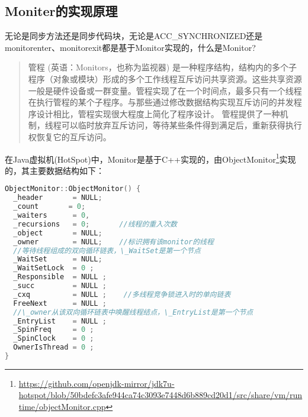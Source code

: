 \documentclass[../../../interview-questions.tex]{subfiles}
\begin{document}
\subsection{Moniter的实现原理}

无论是同步方法还是同步代码块，无论是ACC\_SYNCHRONIZED还是monitorenter、monitorexit都是基于Monitor实现的，什么是Monitor?

\begin{quotation}
管程 (英语：Monitors，也称为监视器) 是一种程序结构，结构内的多个子程序（对象或模块）形成的多个工作线程互斥访问共享资源。这些共享资源一般是硬件设备或一群变量。管程实现了在一个时间点，最多只有一个线程在执行管程的某个子程序。与那些通过修改数据结构实现互斥访问的并发程序设计相比，管程实现很大程度上简化了程序设计。 管程提供了一种机制，线程可以临时放弃互斥访问，等待某些条件得到满足后，重新获得执行权恢复它的互斥访问。
\end{quotation}

在Java虚拟机(HotSpot)中，Monitor是基于C++实现的，由ObjectMonitor\footnote{\url{https://github.com/openjdk-mirror/jdk7u-hotspot/blob/50bdefc3afe944ca74c3093e7448d6b889cd20d1/src/share/vm/runtime/objectMonitor.cpp}}实现的，其主要数据结构如下：

\begin{lstlisting}[language=C]
ObjectMonitor::ObjectMonitor() {  
  _header       = NULL;  
  _count       = 0;  
  _waiters      = 0,  
  _recursions   = 0;       //线程的重入次数
  _object       = NULL;  
  _owner        = NULL;    //标识拥有该monitor的线程
  //等待线程组成的双向循环链表，\_WaitSet是第一个节点
  _WaitSet      = NULL;    
  _WaitSetLock  = 0 ;  
  _Responsible  = NULL ;  
  _succ         = NULL ;  
  _cxq          = NULL ;    //多线程竞争锁进入时的单向链表
  FreeNext      = NULL ;
  //\_owner从该双向循环链表中唤醒线程结点，\_EntryList是第一个节点  
  _EntryList    = NULL ;    
  _SpinFreq     = 0 ;  
  _SpinClock    = 0 ;  
  OwnerIsThread = 0 ;  
}
\end{lstlisting}
\end{document}
